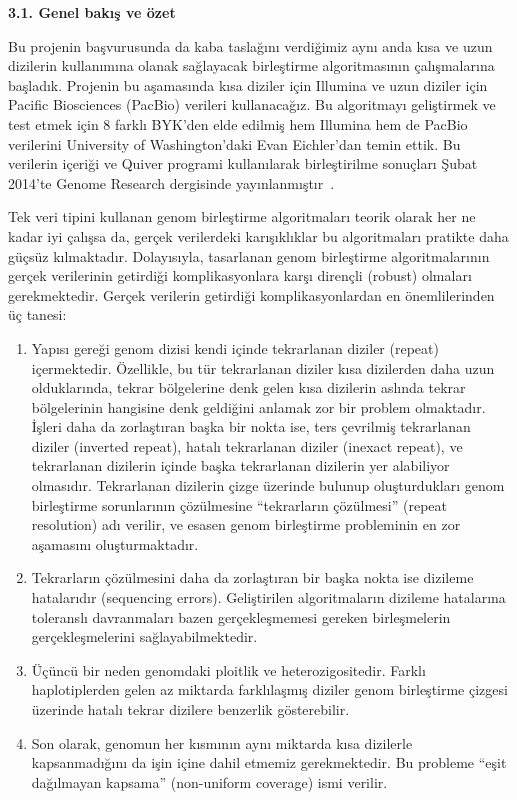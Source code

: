 \documentclass[11pt]{article}
\begin{document}
{\bf \large 3.1. Genel bakış ve özet}

Bu projenin başvurusunda da kaba taslağını verdiğimiz aynı anda kısa ve uzun dizilerin kullanımına olanak sağlayacak birleştirme algoritmasının çalışmalarına başladık. Projenin bu aşamasında
 kısa diziler için Illumina ve uzun diziler için Pacific Biosciences (PacBio) verileri kullanacağız. Bu algoritmayı geliştirmek ve test etmek için 8 farklı BYK'den elde edilmiş 
hem Illumina hem de PacBio verilerini University of Washington'daki Evan Eichler'dan temin ettik. Bu verilerin içeriği ve Quiver 
programi kullanılarak birleştirilme sonuçları Şubat 2014’te Genome Research dergisinde yayınlanmıştır~\cite{Huddleston2014}. 

Tek veri tipini kullanan genom birleştirme algoritmaları teorik olarak her ne kadar iyi çalışsa da, gerçek verilerdeki karışıklıklar bu algoritmaları pratikte daha güçsüz kılmaktadır. Dolayısıyla, tasarlanan genom birleştirme algoritmalarının gerçek verilerinin getirdiği komplikasyonlara karşı dirençli (robust) olmaları gerekmektedir. Gerçek verilerin getirdiği komplikasyonlardan en önemlilerinden üç tanesi:

\begin{enumerate}
\item
  Yapısı gereği genom dizisi kendi içinde tekrarlanan diziler (repeat) içermektedir. Özellikle, bu tür tekrarlanan diziler kısa dizilerden daha uzun olduklarında, tekrar bölgelerine denk gelen kısa dizilerin aslında tekrar bölgelerinin hangisine denk geldiğini anlamak zor bir problem olmaktadır. İşleri daha da zorlaştıran başka bir nokta ise, ters çevrilmiş tekrarlanan diziler (inverted repeat), hatalı tekrarlanan diziler (inexact repeat), ve tekrarlanan dizilerin içinde başka tekrarlanan dizilerin yer alabiliyor olmasıdır. Tekrarlanan dizilerin çizge üzerinde bulunup oluşturdukları genom birleştirme sorunlarının çözülmesine ``tekrarların çözülmesi'' (repeat resolution) adı verilir, ve esasen genom birleştirme probleminin en zor aşamasını oluşturmaktadır.

\item
  Tekrarların çözülmesini daha da zorlaştıran bir başka nokta ise dizileme hatalarıdır (sequencing errors). Geliştirilen algoritmaların dizileme hatalarına toleranslı davranmaları bazen gerçekleşmemesi gereken birleşmelerin gerçekleşmelerini sağlayabilmektedir.

\item
  Üçüncü bir neden genomdaki ploitlik ve heterozigositedir. Farklı haplotiplerden gelen az miktarda farklılaşmış diziler genom birleştirme çizgesi üzerinde hatalı tekrar dizilere benzerlik gösterebilir.

\item
  Son olarak, genomun her kısmının aynı miktarda kısa dizilerle kapsanmadığını da işin içine dahil etmemiz gerekmektedir. Bu probleme ``eşit dağılmayan kapsama'' (non-uniform coverage) ismi verilir.

\end{enumerate}
\end{document}
